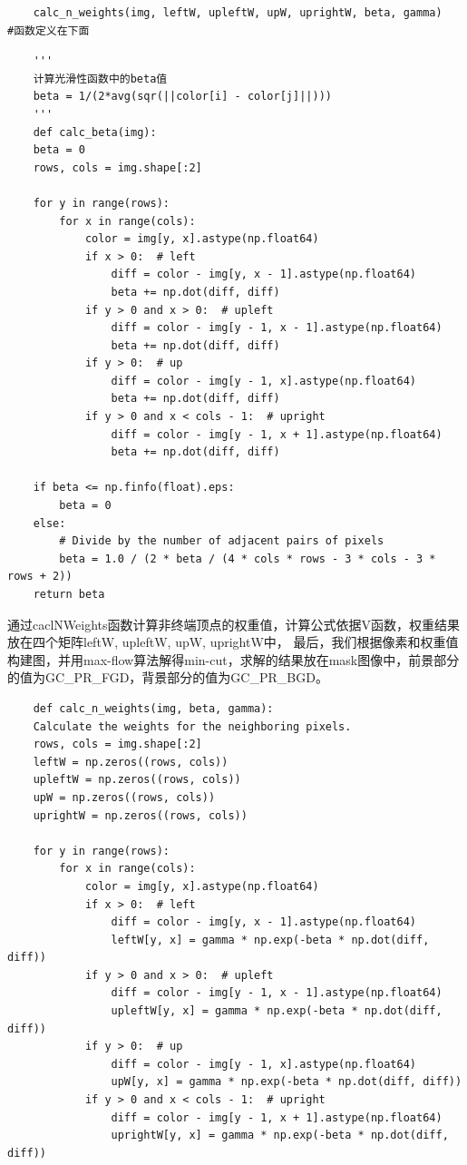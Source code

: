 \documentclass[12pt,a4paper]{article}
\begin{document}
\begin{CJK}{UTF8}{gbsn}
\begin{sloppypar}
\begin{lstlisting}
    calc_n_weights(img, leftW, upleftW, upW, uprightW, beta, gamma)      #函数定义在下面
\end{lstlisting}
\begin{lstlisting}
    '''
    计算光滑性函数中的beta值
    beta = 1/(2*avg(sqr(||color[i] - color[j]||)))
    '''
    def calc_beta(img):
    beta = 0
    rows, cols = img.shape[:2]

    for y in range(rows):
        for x in range(cols):
            color = img[y, x].astype(np.float64)
            if x > 0:  # left
                diff = color - img[y, x - 1].astype(np.float64)
                beta += np.dot(diff, diff)
            if y > 0 and x > 0:  # upleft
                diff = color - img[y - 1, x - 1].astype(np.float64)
                beta += np.dot(diff, diff)
            if y > 0:  # up
                diff = color - img[y - 1, x].astype(np.float64)
                beta += np.dot(diff, diff)
            if y > 0 and x < cols - 1:  # upright
                diff = color - img[y - 1, x + 1].astype(np.float64)
                beta += np.dot(diff, diff)

    if beta <= np.finfo(float).eps:
        beta = 0
    else:
        # Divide by the number of adjacent pairs of pixels
        beta = 1.0 / (2 * beta / (4 * cols * rows - 3 * cols - 3 * rows + 2))
    return beta
\end{lstlisting}
通过caclNWeights函数计算非终端顶点的权重值，计算公式依据V函数，权重结果放在四个矩阵leftW, upleftW, upW, uprightW中，
最后，我们根据像素和权重值构建图，并用max-flow算法解得min-cut，求解的结果放在mask图像中，前景部分的值为GC\_PR\_FGD，背景部分的值为GC\_PR\_BGD。
\begin{lstlisting}
    def calc_n_weights(img, beta, gamma):
    Calculate the weights for the neighboring pixels.
    rows, cols = img.shape[:2]
    leftW = np.zeros((rows, cols))
    upleftW = np.zeros((rows, cols))
    upW = np.zeros((rows, cols))
    uprightW = np.zeros((rows, cols))

    for y in range(rows):
        for x in range(cols):
            color = img[y, x].astype(np.float64)
            if x > 0:  # left
                diff = color - img[y, x - 1].astype(np.float64)
                leftW[y, x] = gamma * np.exp(-beta * np.dot(diff, diff))
            if y > 0 and x > 0:  # upleft
                diff = color - img[y - 1, x - 1].astype(np.float64)
                upleftW[y, x] = gamma * np.exp(-beta * np.dot(diff, diff))
            if y > 0:  # up
                diff = color - img[y - 1, x].astype(np.float64)
                upW[y, x] = gamma * np.exp(-beta * np.dot(diff, diff))
            if y > 0 and x < cols - 1:  # upright
                diff = color - img[y - 1, x + 1].astype(np.float64)
                uprightW[y, x] = gamma * np.exp(-beta * np.dot(diff, diff))


\end{lstlisting}
\end{sloppypar}
\end{CJK}
\end{document}
